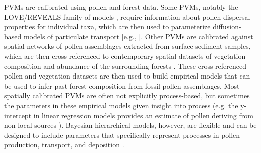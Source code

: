 \documentclass[12pt]{article}
\begin{document}
PVMs are calibrated using pollen and forest data. Some PVMs, notably
the LOVE/REVEALS family of models \citep{sugita2007theory1,
  sugita2007theory2}, require information about pollen dispersal
properties for individual taxa, which are then used to parameterize
diffusion-based models of particulate transport [e.g.,
\citet{prentice1985pollen}]. Other PVMs are calibrated against spatial
networks of pollen assemblages extracted from surface sediment
samples, which are then cross-referenced to contemporary spatial
datasets of vegetation composition and abundance of the surrounding
forests \citep{sugita2007theory1, sugita2007theory2}. These
cross-referenced pollen and vegetation datasets are then used to build
empirical models that can be used to infer past forest composition
from fossil pollen assemblages. Most spatially calibrated PVMs are
often not explicitly process-based, but sometimes the parameters in
these empirical models given insight into process (e.g. the
y-intercept in linear regression models provides an estimate of pollen
deriving from non-local sources \citep{howe1983calibrating}).
Bayesian hierarchical models, however, are flexible and can be
designed to include parameters that specifically represent processes
in pollen production, transport, and deposition
\citep{paciorek2009mapping}.
\end{document}
